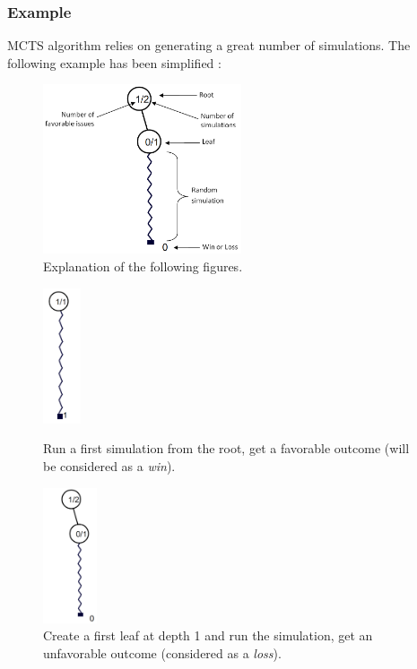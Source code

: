 \subsubsection{Example}
MCTS algorithm relies on generating a great number of simulations. The following example has been simplified :
\label{sec:example}
\begin{figure}[H]
\centering
\includegraphics[height=5cm]{3Algorithms/3.2Algorithm_MCTS_Benoit/img/schema.png}
\caption{\label{fig:schema}Explanation of the following figures.}
\end{figure}

\begin{figure}[H]
\centering
	\begin{minipage}[b]{0.45\linewidth}
		\centering
		\includegraphics[height=4cm]{3Algorithms/3.2Algorithm_MCTS_Benoit/img/1.png}
		\caption{\label{fig:1}Run a first simulation from the root, get a favorable outcome (will be considered as a \textit{win}).}
	\end{minipage}%
	\hspace*{1cm}
	\begin{minipage}[b]{0.45\linewidth}
		\centering
		\includegraphics[height=4cm]{3Algorithms/3.2Algorithm_MCTS_Benoit/img/2.png}
		\caption{\label{fig:2}Create a first leaf at depth 1 and run the simulation, get an unfavorable outcome (considered as a \textit{loss}).}
	\end{minipage}%
\end{figure}

